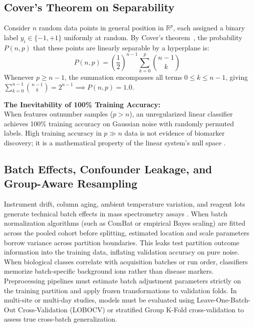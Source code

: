 \documentclass[11pt,oneside]{book}
\begin{document}
\subsection{Cover's Theorem on Separability}

Consider $n$ random data points in general position in $\mathbb{R}^p$, each assigned a binary label $y_i \in \{-1, +1\}$ uniformly at random. By Cover's theorem~\cite{cover1965geometrical}, the probability $P(n, p)$ that these points are linearly separable by a hyperplane is:
\begin{equation}
P(n, p) = \left(\frac{1}{2}\right)^{n-1} \sum_{k=0}^{p} \binom{n-1}{k}
\end{equation}
Whenever $p \ge n - 1$, the summation encompasses all terms $0 \le k \le n-1$, giving $\sum_{k=0}^{n-1} \binom{n-1}{k} = 2^{n-1} \implies P(n, p) = 1.0$.

\begin{biologicalinsight}[top=2pt, bottom=2pt, before skip=2pt, after skip=2pt]
\textbf{The Inevitability of 100\% Training Accuracy:}\\
When features outnumber samples ($p > n$), an unregularized linear classifier achieves 100\% training accuracy on Gaussian noise with randomly permuted labels. High training accuracy in $p \gg n$ data is not evidence of biomarker discovery; it is a mathematical property of the linear system's null space \cite{cover1965geometrical, vapnik1998statistical}.
\end{biologicalinsight}

\subsection{Batch Effects, Confounder Leakage, and Group-Aware Resampling}

Instrument drift, column aging, ambient temperature variation, and reagent lots generate technical batch effects in mass spectrometry assays \cite{broadhurst2006statistical}. When batch normalization algorithms (such as ComBat or empirical Bayes scaling) are fitted across the pooled cohort before splitting, estimated location and scale parameters borrow variance across partition boundaries. This leaks test partition outcome information into the training data, inflating validation accuracy on pure noise. When biological classes correlate with acquisition batches or run order, classifiers memorize batch-specific background ions rather than disease markers. Preprocessing pipelines must estimate batch adjustment parameters strictly on the training partition and apply frozen transformations to validation folds. In multi-site or multi-day studies, models must be evaluated using Leave-One-Batch-Out Cross-Validation (LOBOCV) or stratified Group K-Fold cross-validation to assess true cross-batch generalization.
\end{document}
